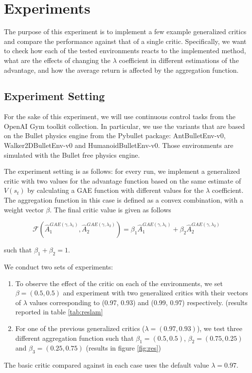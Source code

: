 \section{Experiments}
\label{sec:exp}

The purpose of this experiment is to implement a few example generalized critics and compare the performance against that of a single critic. Specifically, we want to check how each of the tested environments reacts to the implemented method, what are the effects of changing the $\lambda$ coefficient in different estimations of the advantage, and how the average return is affected by the aggregation function.

\subsection{Experiment Setting}
For the sake of this experiment, we will use continuous control tasks from the OpenAI Gym \cite{brockman2016openai} toolkit collection. In particular, we use the variants that are based on the Bullet physics engine from the Pybullet \cite{coumans2019pybullet} package: AntBulletEnv-v0, Walker2DBulletEnv-v0 and HumanoidBulletEnv-v0. Those environments are simulated with the Bullet free physics engine.

The experiment setting is as follows: for every run, we implement a generalized critic with two values for the advantage function based on the same estimate of $V(s_t)$ by calculating a GAE function with different values for the $\lambda$ coefficient. The aggregation function in this case is defined as a convex combination, with a weight vector $\beta$. The final critic value is given as follows

\[ \mathcal{F}(\hat{A}_1^{GAE(\gamma, \lambda_1)}, \hat{A}_2^{GAE(\gamma, \lambda_2)}) = \beta_1\hat{A}_1^{GAE(\gamma, \lambda_1)}+\beta_2\hat{A}_2^{GAE(\gamma, \lambda_2)} \]

such that $\beta_1 + \beta_2 = 1$.

We conduct two sets of experiments: 
\begin{enumerate}
\item To observe the effect of the critic on each of the environments, we set $\beta=(0.5, 0.5)$ and experiment with two generalized critics with their vectors of $\lambda$ values corresponding to (0.97, 0.93) and (0.99, 0.97) respectively. (results reported in table \ref{tab:reslam}
\item For one of the previous generalized critics ($\lambda = (0.97, 0.93)$), we test three different aggregation function such that $\beta_1 = (0.5, 0.5)$, $\beta_2 = (0.75, 0.25)$ and $\beta_3 = (0.25, 0.75)$ (results in figure \ref{fig:res})
\end{enumerate}
The basic critic compared against in each case uses the default value $\lambda = 0.97$.

